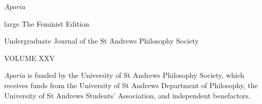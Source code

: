 \begin{center}
    \vspace*{7cm}
    
    {\huge\textit{Aporia}}

    \vspace{1cm}

    {large The Feminist Edition}

    \vspace{3cm}
    \normalsize
    Undergraduate Journal of the St Andrews Philosophy Society

    \vspace{1cm}
    VOLUME XXV
\end{center}

\vfill 

\noindent \textit{Aporia} is funded by the University of St Andrews Philosophy
Society, which receives funds from the University of St Andrews
Department of Philosophy, the University of St Andrews Students’
Association, and independent benefactors.
